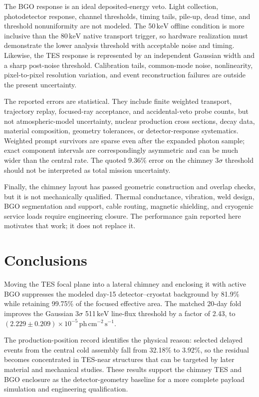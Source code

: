 \documentclass[11pt]{article}
\newcommand{\keV}{\ensuremath{\,\mathrm{keV}}\xspace}
\newcommand{\phflux}{\ensuremath{\,\mathrm{ph\,cm^{-2}\,s^{-1}}}\xspace}
\begin{document}
The BGO response is an ideal deposited-energy veto. Light collection,
photodetector response, channel thresholds, timing tails, pile-up, dead time,
and threshold nonuniformity are not modeled. The 50\keV offline condition is
more inclusive than the 80\keV native transport trigger, so hardware realization
must demonstrate the lower analysis threshold with acceptable noise and timing.
Likewise, the TES response is represented by an independent Gaussian width and
a sharp post-noise threshold. Calibration tails, common-mode noise,
nonlinearity, pixel-to-pixel resolution variation, and event reconstruction
failures are outside the present uncertainty.

The reported errors are statistical. They include finite weighted transport,
trajectory replay, focused-ray acceptance, and accidental-veto probe counts,
but not atmospheric-model uncertainty, nuclear production cross sections,
decay data, material composition, geometry tolerances, or detector-response
systematics. Weighted prompt survivors are sparse even after the expanded
photon sample; exact component intervals are correspondingly asymmetric and
can be much wider than the central rate. The quoted 9.36\% error on the chimney
3$\sigma$ threshold should not be interpreted as total mission uncertainty.

Finally, the chimney layout has passed geometric construction and overlap
checks, but it is not mechanically qualified. Thermal conductance, vibration,
weld design, BGO segmentation and support, cable routing, magnetic shielding,
and cryogenic service loads require engineering closure. The performance gain
reported here motivates that work; it does not replace it.

\section{Conclusions}
\label{sec:conclusions}

Moving the TES focal plane into a lateral chimney and enclosing it with active
BGO suppresses the modeled day-15 detector--cryostat background by 81.9\%
while retaining 99.75\% of the focused effective area. The matched 20-day fold
improves the Gaussian 3$\sigma$ 511\keV line-flux threshold by a factor
of 2.43, to $(2.229\pm0.209)\times10^{-5}\phflux$.

The production-position record identifies the physical reason: selected
delayed events from the central cold assembly fall from 32.18\% to 3.92\%, so
the residual becomes concentrated in TES-near structures that can be targeted
by later material and mechanical studies. These results support the chimney
TES and BGO enclosure as the detector-geometry baseline for a more complete
payload simulation and engineering qualification.
\end{document}
